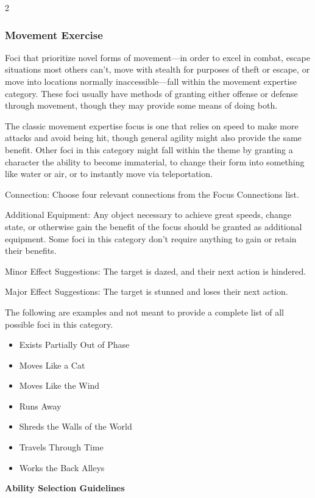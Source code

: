 \begin{multicols}{2}
\subsubsection{Movement Exercise}

Foci that prioritize novel forms of movement—in order to excel in combat, escape situations most others can’t, move with stealth for purposes of theft or escape, or move into locations normally inaccessible—fall within the movement expertise category. These foci usually have methods of granting either offense or defense through movement, though they may provide some means of doing both.

The classic movement expertise focus is one that relies on speed to make more attacks and avoid being hit, though general agility might also provide the same benefit. Other foci in this category might fall within the theme by granting a character the ability to become immaterial, to change their form into something like water or air, or to instantly move via teleportation. 

Connection: Choose four relevant connections from the Focus Connections list. 

Additional Equipment: Any object necessary to achieve great speeds, change state, or otherwise gain the benefit of the focus should be granted as additional equipment. Some foci in this category don’t require anything to gain or retain their benefits.

Minor Effect Suggestions: The target is dazed, and their next action is hindered. 

Major Effect Suggestions: The target is stunned and loses their next action.

The following are examples and not meant to provide a complete list of all possible foci in this category.

\begin{itemize} 
\item Exists Partially Out of Phase
\item Moves Like a Cat
\item Moves Like the Wind
\item Runs Away
\item Shreds the Walls of the World
\item Travels Through Time
\item Works the Back Alleys
\end{itemize}

\textbf{Ability Selection Guidelines}


\end{multicols}
